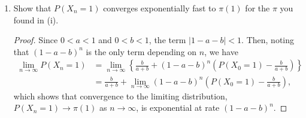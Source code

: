 \documentclass[oneside,reqno]{amsart}
\theoremstyle{definition}
\begin{document}
\begin{enumerate}
\begin{proof}[Proof (by induction on $n$)]
The first base case $n=0$ holds since 
\begin{align*}
	P(X_0 = 1) &= \frac{b}{a+b} + (1-a-b)^0 \left( P(X_0 = 1)- \frac{b}{a+b}\right) \\
					 &= \frac{b}{a+b} + P(X_0 = 1)- \frac{b}{a+b} = P(X_0 = 1),
\end{align*} 
and the second base case $n=1$ holds since
\begin{align*}
	P(X_1 = 1) &= \sum_i P(X_{1} = 1 \mid X_0 = i) P(X_0 = i) \\
					&= P(X_{1} = 1 \mid X_0 = 1) P(X_0 = 1) +  P(X_{1} = 1 \mid X_0 = 2) P(X_0 = 2) \\
					&= (1-a) P(X_0 = 1) +  b (1- P(X_0 = 1) )\\
					&=\frac{b}{a+b} + (1-a-b) \left(P(X_0 = 1)- \frac{b}{a+b}\right)
\end{align*}
where the last equality uses the same logic as in (ii).
\par
Assume the claim is true for any $n$. We want to show that the result is also true for $n+1$. From part (i), we know that 
\[
	P(X_{n+1} = 1) = \frac{b}{a+b} + (1-a-b)\left( P(X_n = 1)- \frac{b}{a+b}\right).
\]
Substituting in for $P(X_n=1)$ gives 
\begin{align*}
	P(X_{n+1} = 1) &= \frac{b}{a+b} + (1-a-b)\left\{ \left((1-a-b)^n \left(P(X_0 = 1)- \frac{b}{a+b}\right)\right) - \frac{b}{a+b}\right\} \\
	&= \frac{b}{a+b} + (1-a-b)^{n+1}\left( P(X_0 = 1)- \frac{b}{a+b}\right).
\end{align*}	
Shifting the indices back one period gives
\[
	P(X_n = 1) = \frac{b}{a+b} + (1-a-b)^n \left( P(X_0 = 1)- \frac{b}{a+b}\right).
\]
\end{proof}

\item
Show that $P(X_n=1)$ converges exponentially fast to $\pi(1)$ for the $\pi$ you found in (i).

\begin{proof}
Since $0<a<1$ and $0<b<1$, the term $|1-a-b| < 1$. Then, noting that $(1-a-b)^n$ is the only term depending on $n$, we have
\begin{align*}
	\lim_{n \to \infty} P(X_n = 1) &= \lim_{n \to \infty}\left\{ \frac{b}{a+b} + (1-a-b)^n \left(P(X_0 = 1)- \frac{b}{a+b}\right)\right\} \\
	&=  \frac{b}{a+b} + \lim_{n \to \infty} (1-a-b)^n  \left( P(X_0 = 1) - \frac{b}{a+b} \right),
\end{align*}
which shows that convergence to the limiting distribution, $P(X_n=1) \to \pi(1)$ as $n \to \infty$, is exponential at rate $(1-a-b)^n$.
\end{proof}
\end{enumerate}
\end{document}

